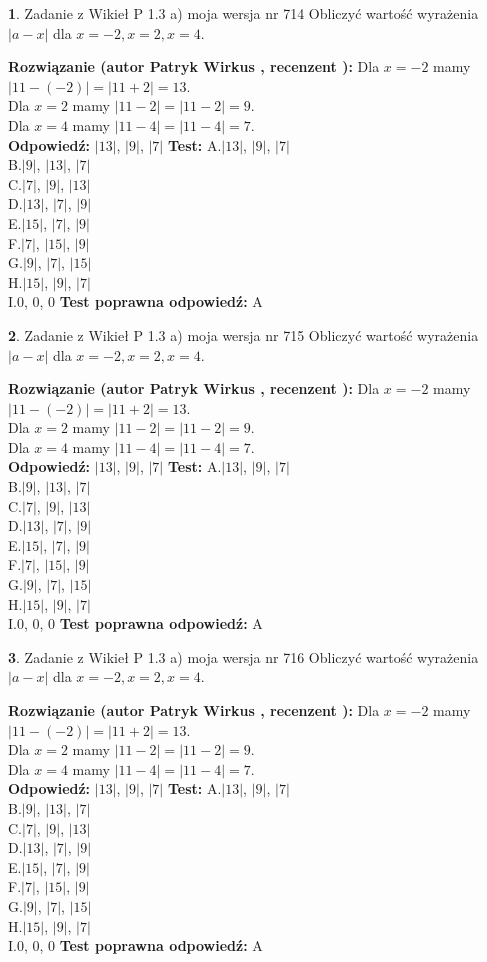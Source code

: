 \documentclass[12pt, a4paper]{article}
\theoremstyle{definition} %
\newtheorem{zad}{}
\newcommand{\zadStart}[1]{\begin{zad}#1\newline}
\newcommand{\zadStop}{\end{zad}}
\newcommand{\rozwStart}[2]{\noindent \textbf{Rozwiązanie (autor #1 , recenzent #2): }\newline}
\newcommand{\rozwStop}{\newline}
\newcommand{\odpStart}{\noindent \textbf{Odpowiedź:}\newline}
\newcommand{\odpStop}{\newline}
\newcommand{\testStart}{\noindent \textbf{Test:}\newline}
\newcommand{\testStop}{\newline}
\newcommand{\kluczStart}{\noindent \textbf{Test poprawna odpowiedź:}\newline}
\newcommand{\kluczStop}{\newline}
\begin{document}
\zadStart{Zadanie z Wikieł P 1.3 a) moja wersja nr 714}
Obliczyć wartość wyrażenia $|a - x|$ dla $x=-2,x=2,x=4$.
\zadStop
\rozwStart{Patryk Wirkus}{}
Dla $x = -2$ mamy $|11 - (-2)| = |11 + 2| = 13$.\\
Dla $x = 2$ mamy $|11 - 2| = |11 - 2| = 9$.\\
Dla $x = 4$ mamy $|11 - 4| = |11 - 4| = 7$.\\
\rozwStop
\odpStart
$|13|$, $|9|$, $|7|$
\odpStop
\testStart
A.$|13|$, $|9|$, $|7|$\\
B.$|9|$, $|13|$, $|7|$\\
C.$|7|$, $|9|$, $|13|$\\
D.$|13|$, $|7|$, $|9|$\\
E.$|15|$, $|7|$, $|9|$\\
F.$|7|$, $|15|$, $|9|$\\
G.$|9|$, $|7|$, $|15|$\\
H.$|15|$, $|9|$, $|7|$\\
I.$0$, $0$, $0$
\testStop
\kluczStart
A
\kluczStop



\zadStart{Zadanie z Wikieł P 1.3 a) moja wersja nr 715}
Obliczyć wartość wyrażenia $|a - x|$ dla $x=-2,x=2,x=4$.
\zadStop
\rozwStart{Patryk Wirkus}{}
Dla $x = -2$ mamy $|11 - (-2)| = |11 + 2| = 13$.\\
Dla $x = 2$ mamy $|11 - 2| = |11 - 2| = 9$.\\
Dla $x = 4$ mamy $|11 - 4| = |11 - 4| = 7$.\\
\rozwStop
\odpStart
$|13|$, $|9|$, $|7|$
\odpStop
\testStart
A.$|13|$, $|9|$, $|7|$\\
B.$|9|$, $|13|$, $|7|$\\
C.$|7|$, $|9|$, $|13|$\\
D.$|13|$, $|7|$, $|9|$\\
E.$|15|$, $|7|$, $|9|$\\
F.$|7|$, $|15|$, $|9|$\\
G.$|9|$, $|7|$, $|15|$\\
H.$|15|$, $|9|$, $|7|$\\
I.$0$, $0$, $0$
\testStop
\kluczStart
A
\kluczStop



\zadStart{Zadanie z Wikieł P 1.3 a) moja wersja nr 716}
Obliczyć wartość wyrażenia $|a - x|$ dla $x=-2,x=2,x=4$.
\zadStop
\rozwStart{Patryk Wirkus}{}
Dla $x = -2$ mamy $|11 - (-2)| = |11 + 2| = 13$.\\
Dla $x = 2$ mamy $|11 - 2| = |11 - 2| = 9$.\\
Dla $x = 4$ mamy $|11 - 4| = |11 - 4| = 7$.\\
\rozwStop
\odpStart
$|13|$, $|9|$, $|7|$
\odpStop
\testStart
A.$|13|$, $|9|$, $|7|$\\
B.$|9|$, $|13|$, $|7|$\\
C.$|7|$, $|9|$, $|13|$\\
D.$|13|$, $|7|$, $|9|$\\
E.$|15|$, $|7|$, $|9|$\\
F.$|7|$, $|15|$, $|9|$\\
G.$|9|$, $|7|$, $|15|$\\
H.$|15|$, $|9|$, $|7|$\\
I.$0$, $0$, $0$
\testStop
\kluczStart
A
\kluczStop
\end{document}
